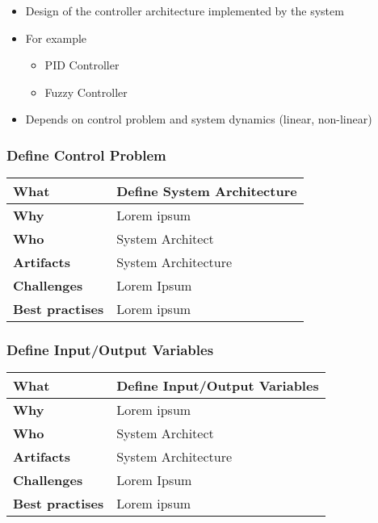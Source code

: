 \begin{itemize}
	\item Design of the controller architecture implemented by the system
	\item For example
	\begin{itemize}
		\item PID Controller
		\item Fuzzy Controller
	\end{itemize}
	\item Depends on control problem and system dynamics (linear, non-linear)
\end{itemize}

\subsubsection{Define Control Problem}
\begin{minipage}{\textwidth}
 \label{table:ch6_Task_Define_Control_Problem}
\begin{tabular}
	{|m{3cm}|m{10cm}|} \hline \bfseries What & Define System Architecture\\
	\hline \bfseries Why & Lorem ipsum\\
	\hline \bfseries Who & System Architect\\
	\hline \bfseries Artifacts & System Architecture\\
	\hline \bfseries Challenges & Lorem Ipsum\\
	\hline \bfseries Best practises & Lorem ipsum\\
	\hline 
\end{tabular}
\end{minipage}

\subsubsection{Define Input/Output Variables}
\begin{minipage}{\textwidth}
 \label{table:ch6_Task_Define_Controller_Variables}
\begin{tabular}
	{|m{3cm}|m{10cm}|} \hline \bfseries What & Define Input/Output Variables\\
	\hline \bfseries Why & Lorem ipsum\\
	\hline \bfseries Who & System Architect\\
	\hline \bfseries Artifacts & System Architecture\\
	\hline \bfseries Challenges & Lorem Ipsum\\
	\hline \bfseries Best practises & Lorem ipsum\\
	\hline 
\end{tabular}
\end{minipage}

